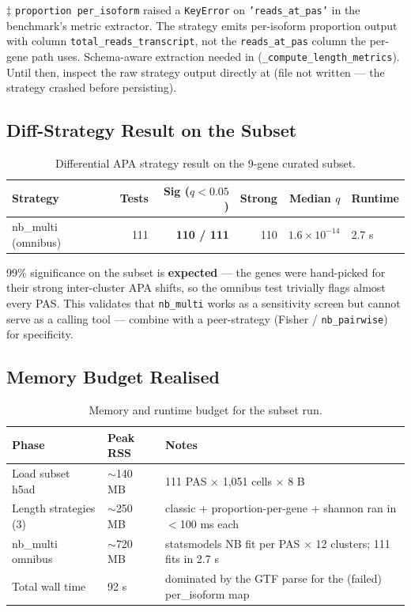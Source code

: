 \documentclass[11pt,a4paper]{article}
\begin{document}
$\ddagger$ \texttt{proportion per\_isoform} raised a \texttt{KeyError} on
\texttt{'reads\_at\_pas'} in the benchmark's metric extractor. The strategy emits
per-isoform proportion output with column \texttt{total\_reads\_transcript}, not the
\texttt{reads\_at\_pas} column the per-gene path uses. Schema-aware extraction needed
in  (\texttt{\_compute\_length\_metrics}).
Until then, inspect the raw strategy output directly at
(file not written --- the strategy crashed before persisting).

\subsection{Diff-Strategy Result on the Subset}

\begin{table}[htbp]
  \centering
  \caption{Differential APA strategy result on the 9-gene curated subset.}
  \label{tab:subset_diff}
  \begin{tabular}{lrrrrl}
    \toprule
    \textbf{Strategy} & \textbf{Tests} & \textbf{Sig ($q{<}0.05$)} &
    \textbf{Strong} & \textbf{Median $q$} & \textbf{Runtime} \\
    \midrule
    nb\_multi (omnibus) & 111 & \textbf{110 / 111} & 110 &
      $1.6 \times 10^{-14}$ & 2.7 s \\
    \bottomrule
  \end{tabular}
\end{table}

99\% significance on the subset is \textbf{expected} --- the genes were hand-picked for
their strong inter-cluster APA shifts, so the omnibus test trivially flags almost every
PAS. This validates that \texttt{nb\_multi} works as a sensitivity screen but cannot
serve as a calling tool --- combine with a peer-strategy (Fisher / \texttt{nb\_pairwise})
for specificity.

\subsection{Memory Budget Realised}

\begin{table}[htbp]
  \centering
  \caption{Memory and runtime budget for the subset run.}
  \label{tab:subset_memory}
  \begin{tabularx}{\textwidth}{llX}
    \toprule
    \textbf{Phase} & \textbf{Peak RSS} & \textbf{Notes} \\
    \midrule
    Load subset h5ad & $\sim$140 MB & 111 PAS $\times$ 1,051 cells $\times$ 8 B \\
    Length strategies (3) & $\sim$250 MB &
      classic + proportion-per-gene + shannon ran in $<$100 ms each \\
    nb\_multi omnibus & $\sim$720 MB &
      statsmodels NB fit per PAS $\times$ 12 clusters; 111 fits in 2.7 s \\
    Total wall time & 92 s &
      dominated by the GTF parse for the (failed) per\_isoform map \\
    \bottomrule
  \end{tabularx}
\end{table}
\end{document}
